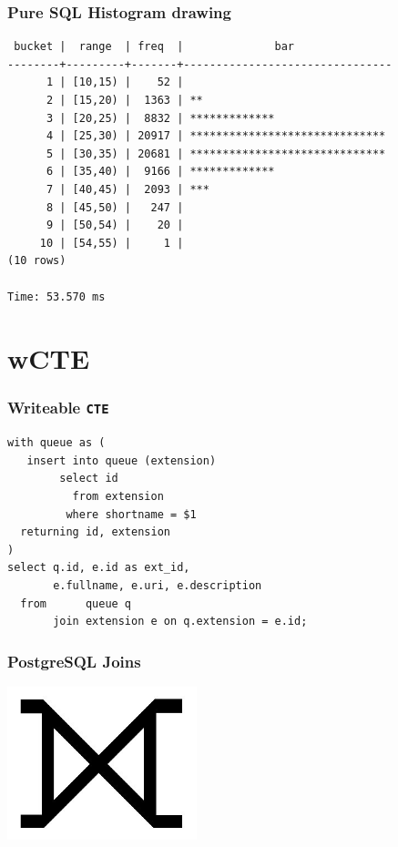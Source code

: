 \documentclass{beamer}
\begin{document}
\begin{frame}[fragile]
  \frametitle{Pure SQL Histogram drawing}
  
  \begin{verbatim}
 bucket |  range  | freq  |              bar               
--------+---------+-------+--------------------------------
      1 | [10,15) |    52 | 
      2 | [15,20) |  1363 | **
      3 | [20,25) |  8832 | *************
      4 | [25,30) | 20917 | ******************************
      5 | [30,35) | 20681 | ******************************
      6 | [35,40) |  9166 | *************
      7 | [40,45) |  2093 | ***
      8 | [45,50) |   247 | 
      9 | [50,54) |    20 | 
     10 | [54,55) |     1 | 
(10 rows)

Time: 53.570 ms
\end{verbatim}
\end{frame}

\section{wCTE}

\begin{frame}[fragile]
  \frametitle{Writeable \texttt{CTE}}
  
  \begin{verbatim}
with queue as (
   insert into queue (extension)
        select id
          from extension
         where shortname = $1
  returning id, extension
)
select q.id, e.id as ext_id,
       e.fullname, e.uri, e.description
  from      queue q
       join extension e on q.extension = e.id;    
  \end{verbatim}
\end{frame}

\begin{frame}
  \frametitle{PostgreSQL Joins}

  \begin{center}
    \includegraphics[height=12em]{huge-full-outer-join.jpg}
  \end{center}
\end{frame}
\end{document}
